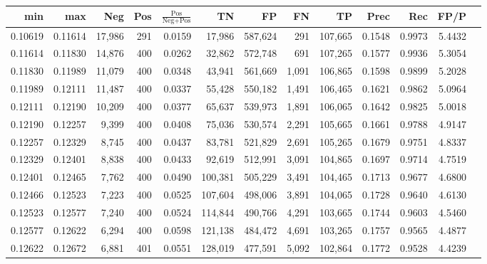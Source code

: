 \begin{tabular}{rrrrrrrrrrrrr}
\toprule
    min &     max &    Neg &   Pos & $\frac{\text{Pos}}{\text{Neg}+\text{Pos}}$ &      TN &      FP &      FN &      TP &   Prec &    Rec &   FP/P \\
\midrule
0.10619 & 0.11614 & 17,986 &   291 &                                     0.0159 &  17,986 & 587,624 &     291 & 107,665 & 0.1548 & 0.9973 & 5.4432 \\
0.11614 & 0.11830 & 14,876 &   400 &                                     0.0262 &  32,862 & 572,748 &     691 & 107,265 & 0.1577 & 0.9936 & 5.3054 \\
0.11830 & 0.11989 & 11,079 &   400 &                                     0.0348 &  43,941 & 561,669 &   1,091 & 106,865 & 0.1598 & 0.9899 & 5.2028 \\
0.11989 & 0.12111 & 11,487 &   400 &                                     0.0337 &  55,428 & 550,182 &   1,491 & 106,465 & 0.1621 & 0.9862 & 5.0964 \\
0.12111 & 0.12190 & 10,209 &   400 &                                     0.0377 &  65,637 & 539,973 &   1,891 & 106,065 & 0.1642 & 0.9825 & 5.0018 \\
0.12190 & 0.12257 &  9,399 &   400 &                                     0.0408 &  75,036 & 530,574 &   2,291 & 105,665 & 0.1661 & 0.9788 & 4.9147 \\
0.12257 & 0.12329 &  8,745 &   400 &                                     0.0437 &  83,781 & 521,829 &   2,691 & 105,265 & 0.1679 & 0.9751 & 4.8337 \\
0.12329 & 0.12401 &  8,838 &   400 &                                     0.0433 &  92,619 & 512,991 &   3,091 & 104,865 & 0.1697 & 0.9714 & 4.7519 \\
0.12401 & 0.12465 &  7,762 &   400 &                                     0.0490 & 100,381 & 505,229 &   3,491 & 104,465 & 0.1713 & 0.9677 & 4.6800 \\
0.12466 & 0.12523 &  7,223 &   400 &                                     0.0525 & 107,604 & 498,006 &   3,891 & 104,065 & 0.1728 & 0.9640 & 4.6130 \\
0.12523 & 0.12577 &  7,240 &   400 &                                     0.0524 & 114,844 & 490,766 &   4,291 & 103,665 & 0.1744 & 0.9603 & 4.5460 \\
0.12577 & 0.12622 &  6,294 &   400 &                                     0.0598 & 121,138 & 484,472 &   4,691 & 103,265 & 0.1757 & 0.9565 & 4.4877 \\
0.12622 & 0.12672 &  6,881 &   401 &                                     0.0551 & 128,019 & 477,591 &   5,092 & 102,864 & 0.1772 & 0.9528 & 4.4239 \\

\end{tabular}
